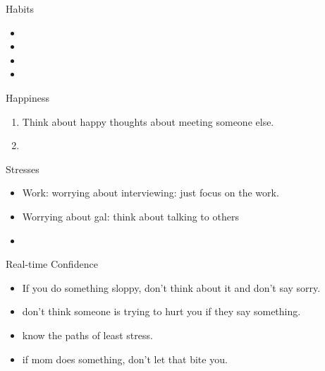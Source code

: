 \documentclass[serif, mathserif, final]{beamer}
\begin{document}
\begin{frame}{} 
  \begin{columns} 
    \begin{column}{0.25\linewidth} %
      \begin{block}{Habits}
        \begin{itemize}
          \tiny \item \tiny 
        \item \tiny 
        \item \tiny 
        \item \tiny 
        \end{itemize}
      \end{block}
      \begin{block}{Happiness} 
        \begin{enumerate}
          \tiny \item \tiny Think about happy thoughts about meeting
          someone else.  
        \item \tiny 
        \end{enumerate}
      \end{block} 

      \begin{block}{Stresses}
        \begin{itemize}
        \item \tiny Work: worrying about interviewing: just
          focus on the work. 
        \item \tiny Worrying about gal: think about talking to
          others 
        \item \tiny 
        \end{itemize} 
      \end{block} 

      \begin{block}{Real-time Confidence}
        \begin{itemize}
          \tiny \item \tiny If you do something sloppy, don't
          think about it and don't say sorry. 
        \item \tiny don't think someone is trying to hurt you if
          they say something.
        \item \tiny know the paths of least stress. 
        \item \tiny if mom does something, don't let that bite you. 
        \end{itemize}
      \end{block}
      

\end{column}
\end{columns}
\end{frame}
\end{document}
